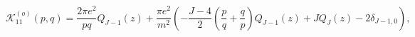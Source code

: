 \begin{equation}
\mathcal{K}_{11}^{\left( o\right) }\left( p,q\right) =\frac{2\pi e^{2}}{pq}%
Q_{J-1}\left( z\right) +\frac{\pi e^{2}}{m^{2}}\left( -\frac{J-4}{2}\left( 
\frac{p}{q}+\frac{q}{p}\right) Q_{J-1}\left( z\right) +JQ_{J}\left( z\right)
-2\delta _{J-1,0}\right) ,
\end{equation}

